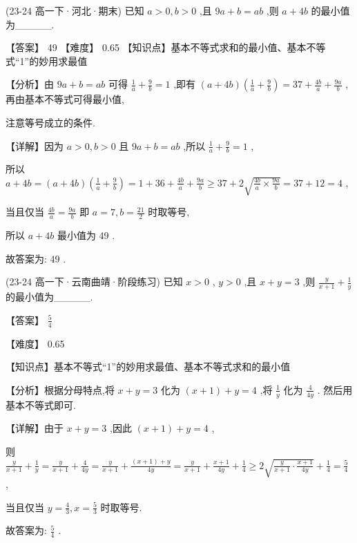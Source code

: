 \documentclass[11pt,a4paper]{article}
\begin{document}
\begin{hmwk} 
 (23-24 高一下·河北·期末) 已知 \(\displaystyle a > 0,b > 0\) ,且 \(\displaystyle {9a} + b = {ab}\) ,则 \(\displaystyle a + {4b}\) 的最小值为\_\_\_\_\_.

\begin{jiexi}
【答案】 49 【难度】 0.65 【知识点】基本不等式求和的最小值、基本不等式“1”的妙用求最值

【分析】由 \(\displaystyle {9a} + b = {ab}\) 可得 \(\displaystyle \frac{1}{a} + \frac{9}{b} = 1\) ,即有 \(\displaystyle \left( {a + {4b}}\right) \left( {\frac{1}{a} + \frac{9}{b}}\right)  = {37} + \frac{4b}{a} + \frac{9a}{b}\) ,再由基本不等式可得最小值,

注意等号成立的条件.

【详解】因为 \(\displaystyle a > 0,b > 0\) 且 \(\displaystyle {9a} + b = {ab}\) ,所以 \(\displaystyle \frac{1}{a} + \frac{9}{b} = 1\) ,

所以 \(\displaystyle a + {4b} = \left( {a + {4b}}\right) \left( {\frac{1}{a} + \frac{9}{b}}\right)  = 1 + {36} + \frac{4b}{a} + \frac{9a}{b} \geq  {37} + 2\sqrt{\frac{4b}{a} \times  \frac{9a}{b}} = {37} + {12} = 4\) ,

当且仅当 \(\displaystyle \frac{4b}{a} = \frac{9a}{b}\) 即 \(\displaystyle a = 7,b = \frac{21}{2}\) 时取等号,

所以 \(\displaystyle a + {4b}\) 最小值为 49 .

故答案为: 49 .

\end{jiexi}
\end{hmwk}
\begin{hmwk} 
 (23-24 高一下·云南曲靖·阶段练习) 已知 \(\displaystyle x > 0\) , \(\displaystyle y > 0\) ,且 \(\displaystyle x + y = 3\) ,则 \(\displaystyle \frac{y}{x + 1} + \frac{1}{y}\) 的最小值为\_\_\_\_\_.

\begin{jiexi}
【答案】 \(\displaystyle \frac{5}{4}\)

【难度】 0.65

【知识点】基本不等式“1”的妙用求最值、基本不等式求和的最小值

【分析】根据分母特点,将 \(\displaystyle x + y = 3\) 化为 \(\displaystyle \left( {x + 1}\right)  + y = 4\) ,将 \(\displaystyle \frac{1}{y}\) 化为 \(\displaystyle \frac{4}{4y}\) . 然后用基本不等式即可.

【详解】由于 \(\displaystyle x + y = 3\) ,因此 \(\displaystyle \left( {x + 1}\right)  + y = 4\) ,

则 \(\displaystyle \frac{y}{x + 1} + \frac{1}{y} = \frac{y}{x + 1} + \frac{4}{4y} = \frac{y}{x + 1} + \frac{\left( {x + 1}\right)  + y}{4y} = \frac{y}{x + 1} + \frac{x + 1}{4y} + \frac{1}{4} \geq  2\sqrt{\frac{y}{x + 1} \cdot  \frac{x + 1}{4y}} + \frac{1}{4} = \frac{5}{4}\) ,

当且仅当 \(\displaystyle y = \frac{4}{3},x = \frac{5}{3}\) 时取等号.

故答案为: \(\displaystyle \frac{5}{4}\) .

\end{jiexi}
\end{hmwk}
\end{document}
